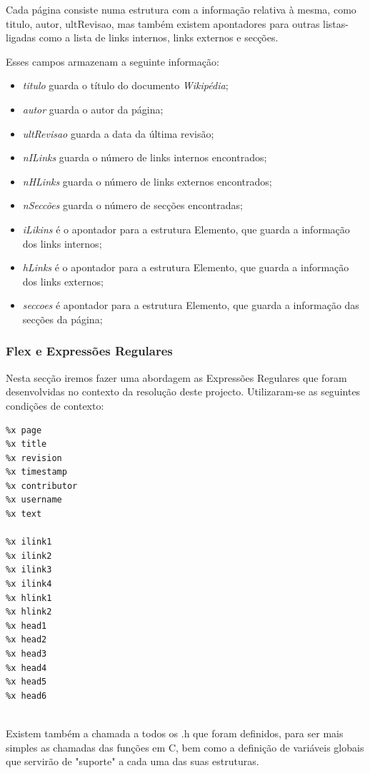 \documentclass[11pt, a4paper, oneside]{article}
\begin{document}
Cada página consiste numa estrutura com a informação relativa à mesma, como titulo, autor, ultRevisao, mas também existem apontadores para outras listas-ligadas como a lista de links internos, links externos e secções.


Esses campos armazenam a seguinte informação:
\begin{itemize}

\item \textit{titulo} guarda o título do documento \textit{Wikipédia};
\item \textit{autor} guarda o autor da página;
\item \textit{ultRevisao} guarda a data da última revisão;
\item \textit{nILinks} guarda o número de links internos encontrados;
\item \textit{nHLinks} guarda o número de links externos encontrados;
\item \textit{nSeccões} guarda o número de secções encontradas;
\item \textit{iLikins} é o apontador para a estrutura Elemento, que guarda a informação dos links internos;
\item \textit{hLinks} é o apontador para a estrutura Elemento, que guarda a informação dos links externos;
\item \textit{seccoes} é apontador para a estrutura Elemento, que guarda a informação das secções da página;



\newpage
\end{itemize}
\subsubsection{Flex e Expressões Regulares}

Nesta secção iremos fazer uma abordagem as Expressões Regulares que foram desenvolvidas no contexto da resolução deste projecto. Utilizaram-se as seguintes condições de contexto:

\begin{verbatim}
%x page
%x title
%x revision
%x timestamp
%x contributor
%x username
%x text

%x ilink1
%x ilink2
%x ilink3
%x ilink4
%x hlink1
%x hlink2
%x head1
%x head2
%x head3
%x head4
%x head5
%x head6


\end{verbatim}


Existem também a chamada a todos os .h que foram definidos, para ser mais simples as chamadas das funções em C, bem como a definição de variáveis globais que servirão de "suporte" a cada uma das suas estruturas.
\end{document}
